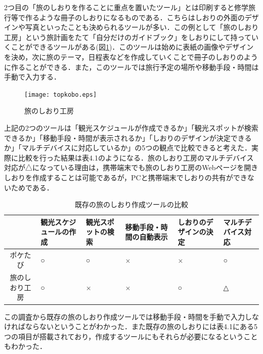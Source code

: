 \documentclass{funthesis}
\begin{document}
2つ目の「旅のしおりを作ることに重点を置いたツール」とは印刷すると修学旅行等で作るような冊子のしおりになるものである．こちらはしおりの外面のデザインや写真といったことも決められるツールが多い．この例として「旅のしおり工房」\cite{tripkobo}という旅計画をたて「自分だけのガイドブック」をしおりにして持っていくことができるツールがある(図\ref{Ltopkobo})．このツールは始めに表紙の画像やデザインを決め，次に旅のテーマ，日程表などを作成していくことで冊子のしおりのように作ることができる．また，このツールでは旅行予定の場所や移動手段・時間は手動で入力する．

\begin{figure}[htpb]
\begin{center}
\texttt{[image: topkobo.eps]}
\end{center}
\caption{旅のしおり工房}
\label{Ltopkobo}
\end{figure}

上記の2つのツールは「観光スケジュールが作成できるか」「観光スポットが検索できるか」「移動手段・時間が表示されるか」「しおりのデザインが決定できるか」「マルチデバイスに対応しているか」の5つの観点で比較できると考えた．実際に比較を行った結果は表4.1のようになる．旅のしおり工房のマルチデバイス対応が△になっている理由は，携帯端末でも旅のしおり工房のWebページを開きしおりを作成することは可能であるが，PCと携帯端末でしおりの共有ができないためである．


\begin{table}[htb]
\begin{center}
\caption{既存の旅のしおり作成ツールの比較}
  \begin{tabular}{|c|p{2.0cm}|p{2.0cm}|p{2.0cm}|p{2.0cm}|p{2.0cm}|} \hline
     & 観光スケジュールの作成 & 観光スポットの検索 & 移動手段・時間の自動表示 & しおりのデザインの決定 & マルチデバイス対応 \\ \hline 
    ポケたび & ○ & ○ & × & × & ○ \\ \hline
    旅のしおり工房 & ○ & × & × & ○ & △\\ \hline
  \end{tabular}
  \end{center}
\end{table}


この調査から既存の旅のしおり作成ツールでは移動手段・時間を手動で入力しなければならないということがわかった．また既存の旅のしおりには表4.1にある5つの項目が搭載されており，作成するツールにもそれらが必要になるということもわかった．\\
\end{document}
